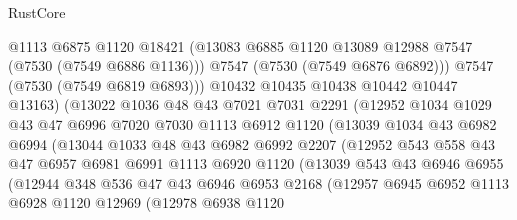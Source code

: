\begin{lexlean}{RustCore}
\begin{coremodule}
                        @1113
                        @6875
                        @1120
                        @18421
                        (@13083 @6885 @1120 @13089 @12988 @7547 (@7530 (@7549 @6886 @1136)))
                        @7547
                        (@7530 (@7549 @6876 @6892)))
                      @7547
                      (@7530 (@7549 @6819 @6893)))
                    @10432
                    @10435
                    @10438
                    @10442
                    @10447
                    @13163)
                  (@13022
                    @1036
                    @48
                    @43
                    @7021
                    @7031
                    @2291
                    (@12952
                      @1034
                      @1029
                      @43
                      @47
                      @6996
                      @7020
                      @7030
                      @1113
                      @6912
                      @1120
                      (@13039
                        @1034
                        @43
                        @6982
                        @6994
                        (@13044
                          @1033
                          @48
                          @43
                          @6982
                          @6992
                          @2207
                          (@12952
                            @543
                            @558
                            @43
                            @47
                            @6957
                            @6981
                            @6991
                            @1113
                            @6920
                            @1120
                            (@13039
                              @543
                              @43
                              @6946
                              @6955
                              (@12944
                                @348
                                @536
                                @47
                                @43
                                @6946
                                @6953
                                @2168
                                (@12957
                                  @6945
                                  @6952
                                  @1113
                                  @6928
                                  @1120
                                  @12969
                                  (@12978
                                    @6938
                                    @1120

\end{coremodule}
\end{lexlean}
